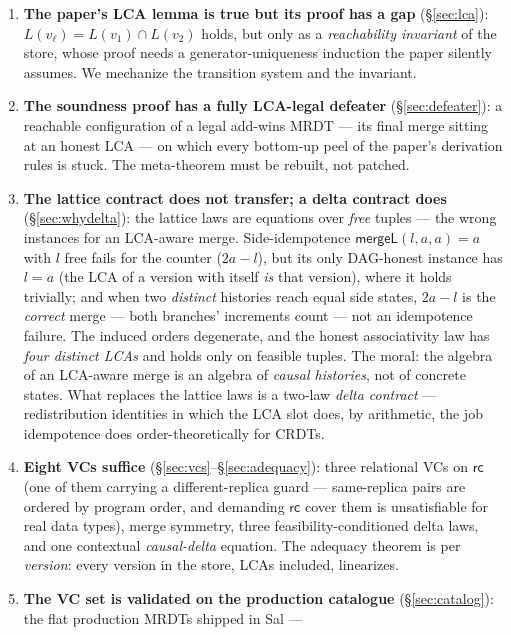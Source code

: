 \documentclass[11pt]{article}
\newcommand{\rcrel}{\mathsf{rc}}                 %
\newcommand{\mergeL}{\mathsf{mergeL}}
\begin{document}
\begin{enumerate}[leftmargin=2em]
\item \textbf{The paper's LCA lemma is true but its proof has a gap}
  (\S\ref{sec:lca}): $L(v_\ell) = L(v_1) \cap L(v_2)$ holds, but only as a
  \emph{reachability invariant} of the store, whose proof needs a
  generator-uniqueness induction the paper silently assumes. We mechanize
  the transition system and the invariant.
\item \textbf{The soundness proof has a fully LCA-legal defeater}
  (\S\ref{sec:defeater}): a reachable configuration of a legal add-wins
  MRDT --- its final merge sitting at an honest LCA --- on which every
  bottom-up peel of the paper's derivation rules is stuck. The
  meta-theorem must be rebuilt, not patched.
\item \textbf{The lattice contract does not transfer; a delta contract does}
  (\S\ref{sec:whydelta}): the lattice laws are equations over \emph{free}
  tuples --- the wrong instances for an LCA-aware merge. Side-idempotence
  $\mergeL(l,a,a) = a$ with $l$ free fails for the counter ($2a-l$), but
  its only DAG-honest instance has $l = a$ (the LCA of a version with
  itself \emph{is} that version), where it holds trivially; and when two
  \emph{distinct} histories reach equal side states, $2a-l$ is the
  \emph{correct} merge --- both branches' increments count --- not an
  idempotence failure. The induced orders degenerate, and the honest
  associativity law has \emph{four distinct LCAs} and holds only on
  feasible tuples. The moral: the algebra of an LCA-aware merge is an
  algebra of \emph{causal histories}, not of concrete states. What
  replaces the lattice laws is a two-law \emph{delta contract} --- redistribution identities in which the LCA
  slot does, by arithmetic, the job idempotence does order-theoretically
  for CRDTs.
\item \textbf{Eight VCs suffice} (\S\ref{sec:vcs}--\S\ref{sec:adequacy}):
  three relational VCs on $\rcrel$ (one of them carrying a
  different-replica guard --- same-replica pairs are ordered by program
  order, and demanding $\rcrel$ cover them is unsatisfiable for
  real data types), merge symmetry, three
  feasibility-conditioned delta laws, and one contextual \emph{causal-delta}
  equation. The adequacy theorem is per \emph{version}: every version in
  the store, LCAs included, linearizes.
\item \textbf{The VC set is validated on the production catalogue}
  (\S\ref{sec:catalog}): the flat production MRDTs shipped in Sal ---

\end{enumerate}
\end{document}
